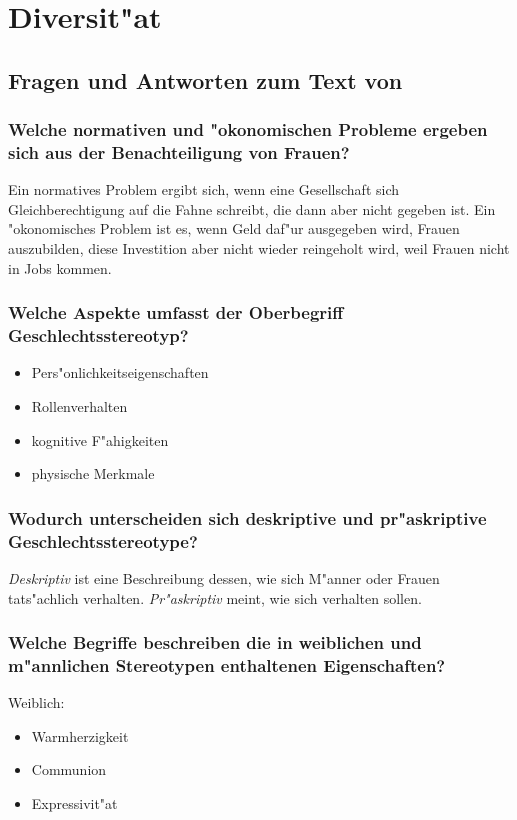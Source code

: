 \section{Diversit"at}
\subsection{Fragen und Antworten zum Text von \textcite{stahlberg_geschlechterdiskriminierung_2009}}
\subsubsection{Welche normativen und "okonomischen Probleme ergeben sich aus der Benachteiligung von Frauen?}
Ein normatives Problem ergibt sich, wenn eine Gesellschaft sich Gleichberechtigung auf die Fahne schreibt, die dann aber nicht gegeben ist. Ein "okonomisches Problem ist es, wenn Geld daf"ur ausgegeben wird, Frauen auszubilden, diese Investition aber nicht wieder reingeholt wird, weil Frauen nicht in Jobs kommen.

\subsubsection{Welche Aspekte umfasst der Oberbegriff Geschlechtsstereotyp?}
\begin{itemize}
        \item Pers"onlichkeitseigenschaften
        \item Rollenverhalten
        \item kognitive F"ahigkeiten
        \item physische Merkmale
\end{itemize}

\subsubsection{Wodurch unterscheiden sich deskriptive und pr"askriptive Geschlechtsstereotype?}
\emph{Deskriptiv} ist eine Beschreibung dessen, wie sich M"anner oder Frauen tats"achlich verhalten. \emph{Pr"askriptiv} meint, wie sich verhalten sollen.

\subsubsection{Welche Begriffe beschreiben die in weiblichen und m"annlichen Stereotypen enthaltenen Eigenschaften?}
Weiblich:
\begin{itemize}
        \item Warmherzigkeit
        \item Communion
        \item Expressivit"at
\end{itemize}

